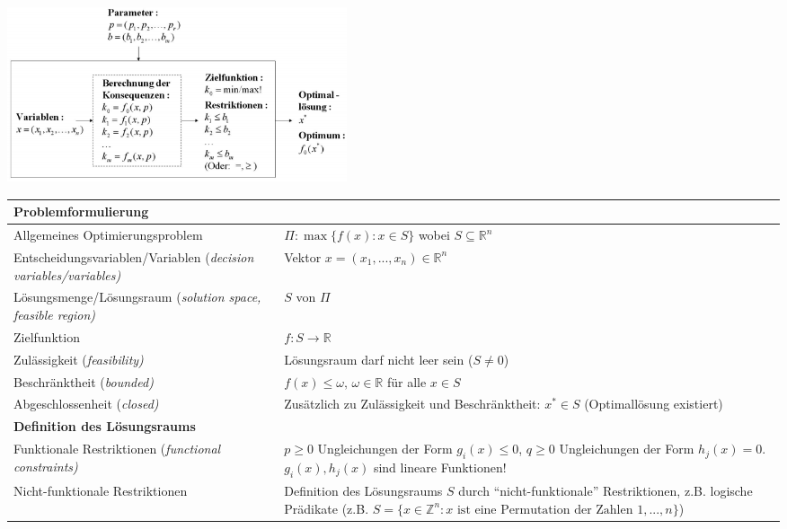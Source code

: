   \begin{center}
    \includegraphics[width=10cm]{./Content/OptMathModels/OptimiziationModel}
  \end{center}
  
  \begin{tabularx}{\textwidth}{p{7cm} X}
  \hline
    \textbf{Problemformulierung} & \\
  \hline
    Allgemeines Optimierungsproblem
      & $\Pi: \max\{f(x) : x \in S\}$ wobei $S \subseteq \mathbb{R}^n$\\
    Entscheidungsvariablen/Variablen (\em decision variables/variables\em)
      & Vektor $x = (x_1, ..., x_n) \in \mathbb{R}^n$\\
    Lösungsmenge/Lösungsraum (\em solution space, feasible region\em)
      & $S$ von $\Pi$\\
    Zielfunktion
      & $f: S \rightarrow \mathbb{R}$\\
    Zulässigkeit (\em feasibility\em)
      & Lösungsraum darf nicht leer sein ($S \neq 0$)\\
    Beschränktheit (\em bounded\em)
      & $f(x) \leq \omega,\, \omega \in \mathbb{R}$ für alle $x \in S$\\
    Abgeschlossenheit (\em closed\em)
      & Zusätzlich zu Zulässigkeit und Beschränktheit: $x^* \in S$ (Optimallösung existiert)\\
  \hline
    \textbf{Definition des Lösungsraums} & \\
  \hline
    Funktionale Restriktionen (\em functional constraints\em)
      & $p\geq 0$ Ungleichungen der Form $g_i(x) \leq 0$, \newline
        $q \geq 0$ Ungleichungen der Form $h_j(x) = 0$.\newline
        $g_i(x), h_j(x)$ sind lineare Funktionen!\\
    Nicht-funktionale Restriktionen 
      & Definition des Lösungsraums $S$ durch "`nicht-funktionale"' Restriktionen, z.B. logische Prädikate (z.B. $S=\{x \in \mathbb{Z}^n: x \text{ ist eine Permutation der Zahlen } 1,...,n \}$) \\

\end{tabularx}

